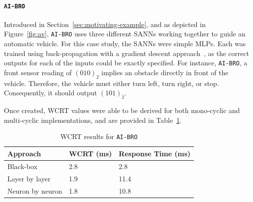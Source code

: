 \paragraph{\texttt{AI-BRO}}
Introduced in Section~\ref{sec:motivating-example}, and as depicted in Figure~\ref{fig:av}, \texttt{AI-BRO} uses three different \acp{SANN} working together to guide an automatic vehicle. 
For this case study, the \acp{SANN} were simple \acp{MLP}.
Each was trained using back-propagation with a gradient descent approach~\cite{yegnanarayana1994artificial}, as the correct outputs for each of the inputs could be exactly specified.
For instance, \texttt{AI-BRO}, a front sensor reading of $(010)_2$ implies an obstacle directly in front of the vehicle.
Therefore, the vehicle must either turn left, turn right, or stop.
Consequently, it should output $(101)_2$.




Once created, \ac{WCRT} values were able to be derived for both mono-cyclic and multi-cyclic implementations, and are provided in Table~\ref{tbl:res-aibro}.

\begin{table}[H]
	\centering
	\caption{\ac{WCRT} results for \texttt{AI-BRO}}
	\label{tbl:res-aibro}
	\begin{tabular}{|l|l|l|}
		\hline
		Approach         & WCRT (ms) & Response Time (ms)\\ \hline
		Black-box        & 2.8  & 2.8  \\ 
		Layer by layer   & 1.9  & 11.4 \\ 
		Neuron by neuron & 1.8  & 10.8 \\ \hline
	\end{tabular}
\end{table}


